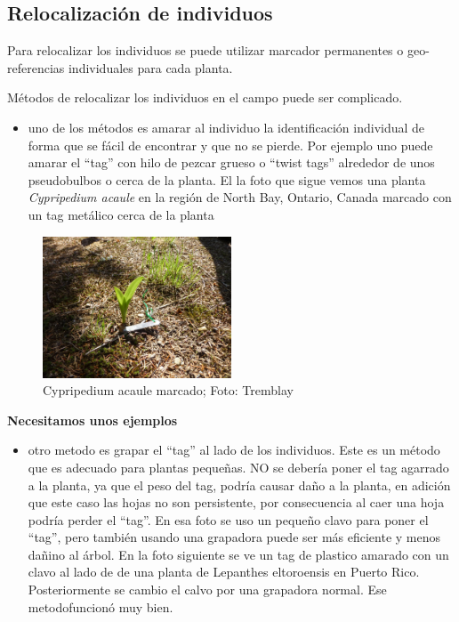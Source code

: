 \documentclass[
]{book}
\providecommand{\tightlist}{%
  \setlength{\itemsep}{0pt}\setlength{\parskip}{0pt}}
\theoremstyle{definition}
\theoremstyle{definition}
\theoremstyle{definition}
\theoremstyle{definition}
\theoremstyle{remark}
\begin{document}
\hypertarget{relocalizaciuxf3n-de-individuos}{%
\subsection{Relocalización de individuos}\label{relocalizaciuxf3n-de-individuos}}

Para relocalizar los individuos se puede utilizar marcador permanentes o geo-referencias individuales para cada planta.

Métodos de relocalizar los individuos en el campo puede ser complicado.

\begin{itemize}
\tightlist
\item
  uno de los métodos es amarar al individuo la identificación individual de forma que se fácil de encontrar y que no se pierde. Por ejemplo uno puede amarar el ``tag'' con hilo de pezcar grueso o ``twist tags'' alrededor de unos pseudobulbos o cerca de la planta. El la foto que sigue vemos una planta \emph{Cypripedium acaule} en la región de North Bay, Ontario, Canada marcado con un tag metálico cerca de la planta
\end{itemize}

\begin{figure}
\centering
\includegraphics[width=0.5\textwidth,height=\textheight]{Figures/Cypripedium_acaule.jpg}
\caption{Cypripedium acaule marcado; Foto: Tremblay}
\end{figure}

\textbf{Necesitamos unos ejemplos}

\begin{itemize}
\tightlist
\item
  otro metodo es grapar el ``tag'' al lado de los individuos. Este es un método que es adecuado para plantas pequeñas. NO se debería poner el tag agarrado a la planta, ya que el peso del tag, podría causar daño a la planta, en adición que este caso las hojas no son persistente, por consecuencia al caer una hoja podría perder el ``tag''. En esa foto se uso un pequeño clavo para poner el ``tag'', pero también usando una grapadora puede ser más eficiente y menos dañino al árbol. En la foto siguiente se ve un tag de plastico amarado con un clavo al lado de de una planta de Lepanthes eltoroensis en Puerto Rico. Posteriormente se cambio el calvo por una grapadora normal. Ese metodofuncionó muy bien.
\end{itemize}
\end{document}
